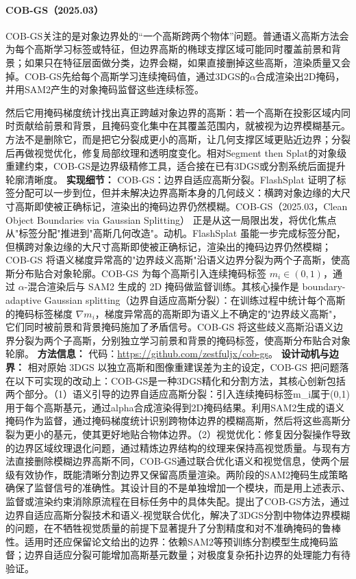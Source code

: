 \paragraph{COB-GS（2025.03）\cite{2503_19443}}
COB-GS关注的是对象边界处的“一个高斯跨两个物体”问题。普通语义高斯方法会为每个高斯学习标签或特征，但边界高斯的椭球支撑区域可能同时覆盖前景和背景；如果只在特征层面做分类，边界会糊，如果直接删掉这些高斯，渲染质量又会掉。COB-GS先给每个高斯学习连续掩码值，通过3DGS的$\alpha$合成渲染出2D掩码，并用SAM2产生的对象掩码监督这些连续标签。

然后它用掩码梯度统计找出真正跨越对象边界的高斯：若一个高斯在投影区域内同时贡献给前景和背景，且掩码变化集中在其覆盖范围内，就被视为边界模糊基元。方法不是删除它，而是把它分裂成更小的高斯，让几何支撑区域更贴近边界；分裂后再做视觉优化，修复局部纹理和透明度变化。相对Segment then Splat的对象级重建约束，COB-GS是边界级精修工具，适合接在已有3DGS或分割系统后面提升轮廓清晰度。
\textbf{实现细节：} COB-GS：边界自适应高斯分裂。FlashSplat 证明了标签分配可以一步到位，但并未解决边界高斯本身的几何歧义：横跨对象边缘的大尺寸高斯即使被正确标记，渲染出的掩码边界仍然模糊。COB-GS（2025.03，Clean Object Boundaries via Gaussian Splitting） 正是从这一局限出发，将优化焦点从"标签分配"推进到"高斯几何改造"。动机。FlashSplat 虽能一步完成标签分配，但横跨对象边缘的大尺寸高斯即使被正确标记，渲染出的掩码边界仍然模糊；COB-GS 将语义梯度异常高的"边界歧义高斯"沿语义边界分裂为两个子高斯，使高斯分布贴合对象轮廓。COB-GS 为每个高斯引入连续掩码标签 $m_i \in (0,1)$，通过 $\alpha$-混合渲染后与 SAM2 生成的 2D 掩码做监督训练。其核心操作是 boundary-adaptive Gaussian splitting（边界自适应高斯分裂）：在训练过程中统计每个高斯的掩码标签梯度 $\nabla m_i$，梯度异常高的高斯即为语义上不确定的"边界歧义高斯"，它们同时被前景和背景掩码施加了矛盾信号。COB-GS 将这些歧义高斯沿语义边界分裂为两个子高斯，分别独立学习前景和背景的掩码标签，使高斯分布贴合对象轮廓。
\textbf{方法信息：} 代码：\url{https://github.com/zestfuljx/cob-gs}。
\textbf{设计动机与边界：} 相对原始 3DGS 以独立高斯和图像重建误差为主的设定，COB-GS 把问题落在以下可实现的改动上：COB-GS是一种3DGS精化和分割方法，其核心创新包括两个部分。（1）语义引导的边界自适应高斯分裂：引入连续掩码标签m\_i属于(0,1)用于每个高斯基元，通过alpha合成渲染得到2D掩码结果。利用SAM2生成的语义掩码作为监督，通过掩码梯度统计识别跨物体边界的模糊高斯，然后将这些高斯分裂为更小的基元，使其更好地贴合物体边界。（2）视觉优化：修复因分裂操作导致的边界区域纹理退化问题，通过精炼边界结构的纹理来保持高视觉质量。与现有方法直接删除模糊边界高斯不同，COB-GS通过联合优化语义和视觉信息，使两个层级有效协作，既能清晰分割边界又保留高质量渲染。两阶段的SAM2掩码生成策略确保了监督信号的准确性。其设计目的不是单独增加一个模块，而是用上述表示、监督或渲染约束消除原流程在目标任务中的具体失配。提出了COB-GS方法，通过边界自适应高斯分裂技术和语义-视觉联合优化，解决了3DGS分割中物体边界模糊的问题，在不牺牲视觉质量的前提下显著提升了分割精度和对不准确掩码的鲁棒性。适用时还应保留论文给出的边界：依赖SAM2等预训练分割模型生成掩码监督；边界自适应分裂可能增加高斯基元数量；对极度复杂拓扑边界的处理能力有待验证。
